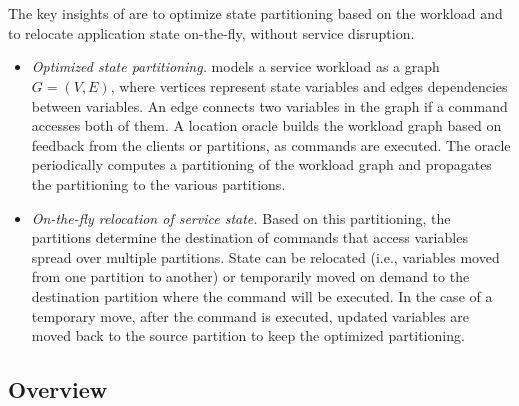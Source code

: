 \section{\dynastar}
\label{sec:dynastar}

The key insights of \dynastar are to optimize state partitioning based on the workload and to relocate application state on-the-fly, without service disruption.
\begin{itemize}
\item \emph{Optimized state partitioning.}
\dynastar models a service workload as a graph $G = (V, E)$, where vertices represent state variables and edges dependencies between variables.
An edge connects two variables in the graph if a command accesses both of them.
A location oracle builds the workload graph based on feedback from the clients or partitions, as commands are executed.
The oracle periodically computes a partitioning of the workload graph and propagates the partitioning to the various partitions.

\item \emph{On-the-fly relocation of service state.}
Based on this partitioning, the partitions determine the destination of commands that access variables spread over multiple partitions.
State can be relocated (i.e., variables moved from one partition to another) or temporarily moved on demand to the destination partition where the command will be executed. 
In the case of a temporary move, after the command is executed, updated variables are moved back to the source partition to keep the optimized partitioning.
\end{itemize}


\subsection{Overview}



